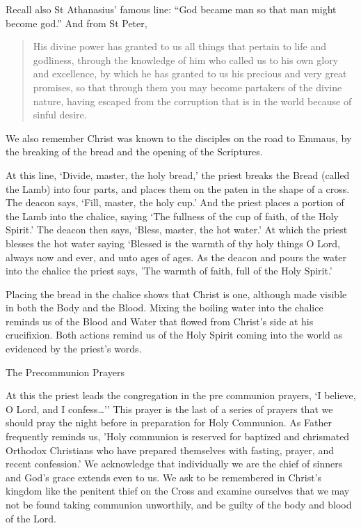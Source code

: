 \documentclass[
]{article}
\begin{document}
Recall also St Athanasius' famous line: ``God became man so that man
might become god.'' And from St Peter,

\begin{quote}
His divine power has granted to us all things that pertain to life and
godliness, through the knowledge of him who called us to his own glory
and excellence, by which he has granted to us his precious and very
great promises, so that through them you may become partakers of the
divine nature, having escaped from the corruption that is in the world
because of sinful desire.
\end{quote}

We also remember Christ was known to the disciples on the road to
Emmaus, by the breaking of the bread and the opening of the Scriptures.

At this line, `Divide, master, the holy bread,' the priest breaks the
Bread (called the Lamb) into four parts, and places them on the paten in
the shape of a cross. The deacon says, `Fill, master, the holy cup.' And
the priest places a portion of the Lamb into the chalice, saying `The
fullness of the cup of faith, of the Holy Spirit.' The deacon then says,
`Bless, master, the hot water.' At which the priest blesses the hot
water saying `Blessed is the warmth of thy holy things O Lord, always
now and ever, and unto ages of ages. As the deacon and pours the water
into the chalice the priest says, 'The warmth of faith, full of the Holy
Spirit.'

Placing the bread in the chalice shows that Christ is one, although made
visible in both the Body and the Blood. Mixing the boiling water into
the chalice reminds us of the Blood and Water that flowed from Christ's
side at his crucifixion. Both actions remind us of the Holy Spirit
coming into the world as evidenced by the priest's words.

The Precommunion Prayers

At this the priest leads the congregation in the pre communion prayers,
`I believe, O Lord, and I confess\ldots'' This prayer is the last of a
series of prayers that we should pray the night before in preparation
for Holy Communion. As Father frequently reminds us, 'Holy communion is
reserved for baptized and chrismated Orthodox Christians who have
prepared themselves with fasting, prayer, and recent confession.' We
acknowledge that individually we are the chief of sinners and God's
grace extends even to us. We ask to be remembered in Christ's kingdom
like the penitent thief on the Cross and examine ourselves that we may
not be found taking communion unworthily, and be guilty of the body and
blood of the Lord.
\end{document}
